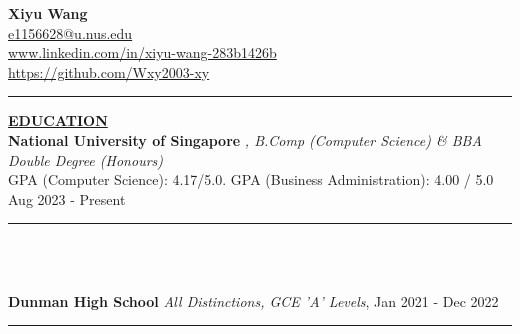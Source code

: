\documentclass{article}
\begin{document}
\begin{center}
\thispagestyle{empty}
\large \textbf{Xiyu Wang} \\
\normalsize \href{mailto:e1156628@u.nus.edu}{e1156628@u.nus.edu} \\
\href{https://www.linkedin.com/in/xiyu-wang-283b1426b}{www.linkedin.com/in/xiyu-wang-283b1426b} \\
\href{https://github.com/Wxy2003-xy}{https://github.com/Wxy2003-xy}   
\noindent\rule{\linewidth}{0.4pt}
\end{center}

\vspace{0.2cm}

\noindent \textbf{\underline{EDUCATION}} \\

\noindent\textbf{National University of Singapore} \textit{, B.Comp (Computer Science) \& BBA Double Degree (Honours)} \\
\indent\indent    \hfill GPA (Computer Science): 4.17/5.0. GPA (Business Administration): 4.00 / 5.0 {   } Aug 2023 - Present \\
\vspace{-0.7cm} %

\noindent\rule{\linewidth}{0.4pt} %
\indent \textbullet{}  \\
\indent \text{} \\

\vspace{0.1cm}

\noindent\textbf{Dunman High School} \hfill \textit{All Distinctions, GCE 'A' Levels}, Jan 2021 - Dec 2022\\
\vspace{-0.7cm} %

\noindent\rule{\linewidth}{0.4pt} %
\indent \textbullet{} \noindent {} \\
\indent \textbullet{} \noindent {} \\
\end{document}
